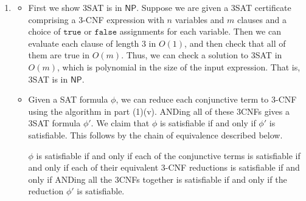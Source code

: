 \documentclass[12 pt, letterpaper]{hmcpset}
\begin{document}
\begin{solution}
\begin{enumerate}[label = (\arabic*)]
\begin{enumerate}[label = (\roman*)]
					Thus, our 3-CNF expression is satisfiable if and only if the original expression is satisfiable.

				\item We claim that $C_{k}$ with $k \ge 5$ is satisfiable if and only if the 3-CNF
					\[
						(\ell_{1} \vee \ell_{2} \vee {z_{1}}) \wedge (\ell_{3} \vee \ell_{4} \vee z_{2}) \wedge (\ell_{5} \vee {z_{1}} \vee \overline{z_{2}}) \wedge (\ell_{6} \vee z_{2} \vee \overline{z_{6}}) \wedge (\ell_{7} \vee z_{6} \vee \overline{z_{7}}) \dots \wedge (\ell_{k} \vee z_{k - 1} \vee \overline{z_{k}})
					\]
					is satisfiable. This is because they are both satisfiable if and only if at least one of the $\ell_{i}$ is true.

					This is clearly true for $C_{k}$.

					If all $\ell_{i}$ are false then we are left with an unsatisfiable expression. If one of the $\ell_{i}$ is true then we can set $z_{i - 1}$ to whatever we want to make all the previous conjunctives true and $z_{i}$ also to whatever we want to make all the following conjunctives true.

					Thus, the 3-CNF is satisfiable if and only if $C_{k}$ is.
			\end{enumerate}

		\item
			\begin{itemize}
				\item First we show 3SAT is in $\mathsf{NP}$. Suppose we are given a 3SAT certificate comprising a 3-CNF expression with $n$ variables and $m$ clauses and a choice of $\mathtt{true}$ or $\mathtt{false}$ assignments for each variable. Then we can evaluate each clause of length $3$ in $O(1)$, and then check that all of them are true in $O(m)$. Thus, we can check a solution to 3SAT in $O(m)$, which is polynomial in the size of the input expression. That is, 3SAT is in $\mathsf{NP}$.

				\item Given a SAT formula $\phi$, we can reduce each conjunctive term to 3-CNF using the algorithm in part (1)(v). ANDing all of these 3CNFs gives a 3SAT formula $\phi'$. We claim that $\phi$ is satisfiable if and only if $\phi'$ is satisfiable. This follows by the chain of equivalence described below.

					$\phi$ is satisfiable if and only if each of the conjunctive terms is satisfiable if and only if each of their equivalent 3-CNF reductions is satisfiable if and only if ANDing all the 3CNFs together is satisfiable if and only if the reduction $\phi'$ is satisfiable.


\end{itemize}
\end{enumerate}
\end{solution}
\end{document}
